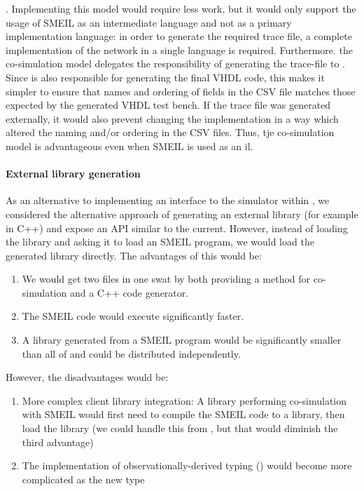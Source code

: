 . Implementing this model would require less
work, but it would only support the usage of SMEIL as an intermediate language
and not as a primary implementation language: in order to generate the required
trace file, a complete implementation of the network in a single language is
required. Furthermore. the co-simulation model delegates the responsibility of
generating the trace-file to \libsme{}. Since \libsme{} is also responsible for
generating the final VHDL code, this makes it simpler to ensure that names and
ordering of fields in the CSV file matches those expected by the generated VHDL
test bench. If the trace file was generated externally, it would also prevent
changing the \libsme{} implementation in a way which altered the naming and/or
ordering in the CSV files. Thus, tje co-simulation model is advantageous even
when SMEIL is used as an \gls{il}.

\paragraph{External library generation}
As an alternative to implementing an interface to the simulator within
\libsme{}, we considered the alternative approach of generating an external
library (for example in C++) and expose an API similar to the current. However,
instead of loading the \libsme{} library and asking it to load an SMEIL program,
we would load the generated library directly. The advantages of this would be:
\begin{enumerate}
\item We would get two files in one swat by both providing a method for
  co-simulation and a C++ code generator.
\item The SMEIL code would execute significantly faster.
\item A library generated from a SMEIL program would be significantly smaller
  than all of \libsme{} and could be distributed independently.
\end{enumerate}
However, the disadvantages would be:
\begin{enumerate}
\item More complex client library integration: A library performing
  co-simulation with SMEIL would first need to compile the SMEIL code to a
  library, then load the library (we could handle this from \libsme{}, but
  that would diminish the third advantage)
\item The implementation of observationally-derived typing ()
  would become more complicated as the new type
\end{enumerate}
    
